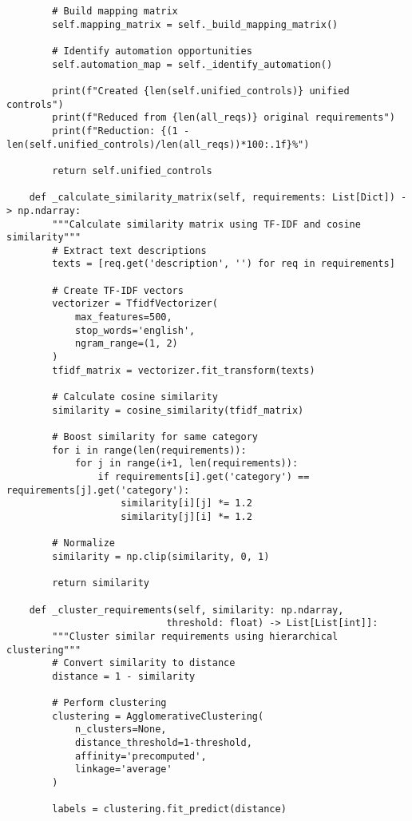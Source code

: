 \begin{verbatim}
        # Build mapping matrix
        self.mapping_matrix = self._build_mapping_matrix()
        
        # Identify automation opportunities
        self.automation_map = self._identify_automation()
        
        print(f"Created {len(self.unified_controls)} unified controls")
        print(f"Reduced from {len(all_reqs)} original requirements")
        print(f"Reduction: {(1 - len(self.unified_controls)/len(all_reqs))*100:.1f}%")
        
        return self.unified_controls
    
    def _calculate_similarity_matrix(self, requirements: List[Dict]) -> np.ndarray:
        """Calculate similarity matrix using TF-IDF and cosine similarity"""
        # Extract text descriptions
        texts = [req.get('description', '') for req in requirements]
        
        # Create TF-IDF vectors
        vectorizer = TfidfVectorizer(
            max_features=500,
            stop_words='english',
            ngram_range=(1, 2)
        )
        tfidf_matrix = vectorizer.fit_transform(texts)
        
        # Calculate cosine similarity
        similarity = cosine_similarity(tfidf_matrix)
        
        # Boost similarity for same category
        for i in range(len(requirements)):
            for j in range(i+1, len(requirements)):
                if requirements[i].get('category') == requirements[j].get('category'):
                    similarity[i][j] *= 1.2
                    similarity[j][i] *= 1.2
        
        # Normalize
        similarity = np.clip(similarity, 0, 1)
        
        return similarity
    
    def _cluster_requirements(self, similarity: np.ndarray, 
                            threshold: float) -> List[List[int]]:
        """Cluster similar requirements using hierarchical clustering"""
        # Convert similarity to distance
        distance = 1 - similarity
        
        # Perform clustering
        clustering = AgglomerativeClustering(
            n_clusters=None,
            distance_threshold=1-threshold,
            affinity='precomputed',
            linkage='average'
        )
        
        labels = clustering.fit_predict(distance)
        

\end{verbatim}

